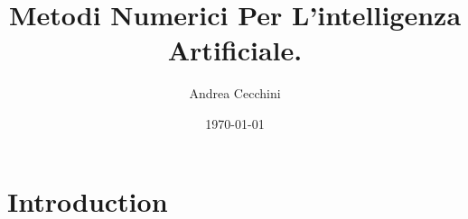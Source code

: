\documentclass{article}
\author{Andrea Cecchini}
\title{\textbf{Metodi Numerici Per L'intelligenza Artificiale.}}
\date{\today}
\begin{document}
\maketitle
\tableofcontents

\section{Introduction}
\end{document}
